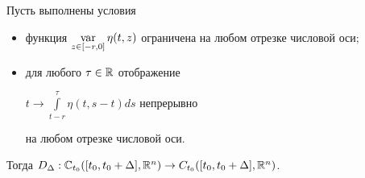 \begin{lems}


Пусть выполнены условия


\begin{itemize}


\item[1)] функция $\Var\limits_{z\in [-r,0]}


\eta (t,z) $ ограничена на любом отрезке числовой оси$;$


\item[2)] для любого $\tau\in\Bbb{R}$ отображение 


$t \to\int\limits_{t-r}^{\tau}\eta (t,s-t) ds$ непрерывно 


на любом отрезке числовой оси.


\end{itemize}


Тогда $D_{\Delta}:\Bbb C_{t_{0}} ([t_{0},t_{0}+\Delta]


,\Bbb{R}^{n}) \to C_{t_{0}} ([t_{0}


,t_{0}+\Delta],\Bbb{R}^{n}) $.


\end{lems}






